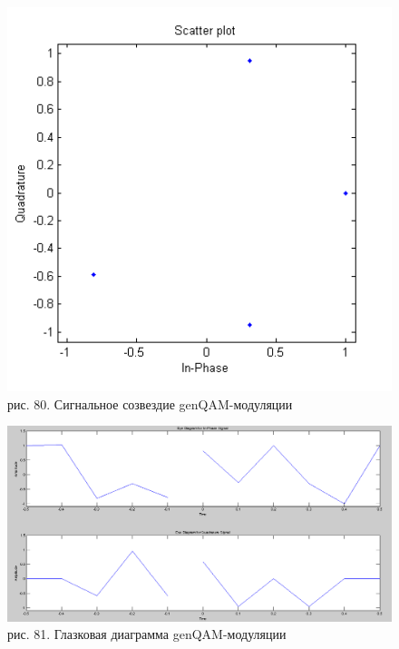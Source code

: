 \documentclass[10pt,a4paper]{report}
\begin{document}
\begin{figure}
\begin{center}
\includegraphics[width=150mm, scale = 0.9]{9_13}\newline
рис. 80. Сигнальное созвездие genQAM-модуляции\newline
\end{center}
\end{figure}
\begin{figure}
\begin{center}
\includegraphics[width=150mm, scale = 0.9]{9_14}\newline
рис. 81. Глазковая диаграмма genQAM-модуляции\newline
\end{center}
\end{figure}
\end{document}

